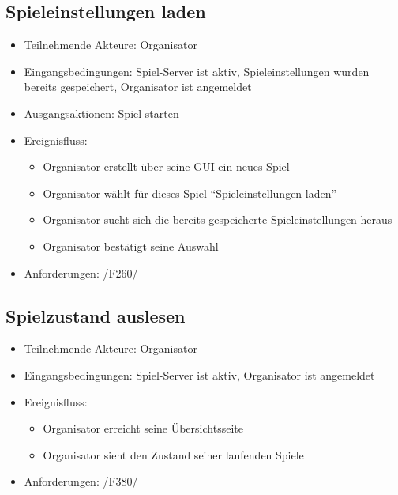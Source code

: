 \documentclass[a4paper]{scrreprt}
\begin{document}
    \subsection{Spieleinstellungen laden}
    \begin{itemize}
        \item Teilnehmende Akteure: \Gls{Organisator}
        \item Eingangsbedingungen: \Gls{Spiel-Server} ist aktiv, \Gls{Spieleinstellungen} wurden bereits gespeichert, \Gls{Organisator} ist angemeldet
        \item Ausgangsaktionen: \Gls{Spiel} starten
        \item Ereignisfluss:
        \begin{itemize}
            \item \Gls{Organisator} erstellt über seine GUI ein neues Spiel
            \item \Gls{Organisator} wählt für dieses \Gls{Spiel} \enquote{Spieleinstellungen laden}
            \item \Gls{Organisator} sucht sich die bereits gespeicherte \Gls{Spieleinstellungen} heraus
            \item \Gls{Organisator} bestätigt seine Auswahl
        \end{itemize}
        \item Anforderungen: /F260/
    \end{itemize}

 \subsection{Spielzustand auslesen}
	\begin{itemize}
		\item Teilnehmende Akteure: \Gls{Organisator}
		\item Eingangsbedingungen: \Gls{Spiel-Server} ist aktiv, \Gls{Organisator} ist angemeldet
		\item Ereignisfluss:
		\begin{itemize}
			\item \Gls{Organisator} erreicht seine Übersichtsseite
			\item \Gls{Organisator} sieht den Zustand seiner laufenden Spiele
		\end{itemize}
        \item Anforderungen: /F380/
	\end{itemize}
\end{document}
